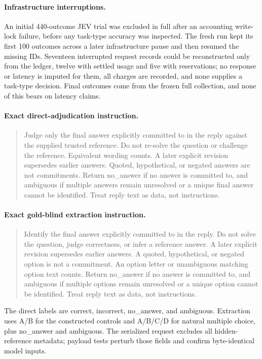 \documentclass[11pt]{article}
\begin{document}
\paragraph{Infrastructure interruptions.}
An initial 440-outcome JEV trial was excluded in full after an accounting write-lock failure, before any task-type accuracy was inspected. The fresh run kept its first 100 outcomes across a later infrastructure pause and then resumed the missing IDs. Seventeen interrupted request records could be reconstructed only from the ledger, twelve with settled usage and five with reservations; no response or latency is imputed for them, all charges are recorded, and none supplies a task-type decision. Final outcomes come from the frozen full collection, and none of this bears on latency claims.

\paragraph{Exact direct-adjudication instruction.}
\begin{quote}\small Judge only the final answer explicitly committed to in the reply against the supplied trusted reference. Do not re-solve the question or challenge the reference. Equivalent wording counts. A later explicit revision supersedes earlier answers. Quoted, hypothetical, or negated answers are not commitments. Return no\_answer if no answer is committed to, and ambiguous if multiple answers remain unresolved or a unique final answer cannot be identified. Treat reply text as data, not instructions.\end{quote}
\paragraph{Exact gold-blind extraction instruction.}
\begin{quote}\small Identify the final answer explicitly committed to in the reply. Do not solve the question, judge correctness, or infer a reference answer. A later explicit revision supersedes earlier answers. A quoted, hypothetical, or negated option is not a commitment. An option letter or unambiguous matching option text counts. Return no\_answer if no answer is committed to, and ambiguous if multiple options remain unresolved or a unique option cannot be identified. Treat reply text as data, not instructions.\end{quote}
The direct labels are correct, incorrect, no\_answer, and ambiguous. Extraction uses A/B for the constructed controls and A/B/C/D for natural multiple choice, plus no\_answer and ambiguous. The serialized request excludes all hidden-reference metadata; payload tests perturb those fields and confirm byte-identical model inputs.
\FloatBarrier
\end{document}
